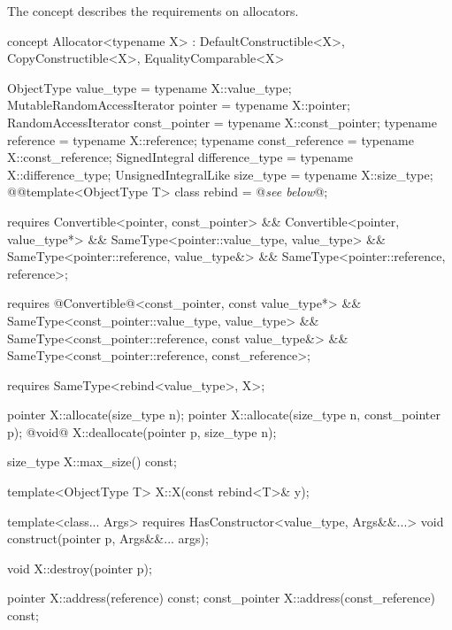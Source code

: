 \documentclass[american,twoside]{book}
\begin{document}

\pnum
{}
{The \mbox{} concept describes the requirements on
  allocators.} 

\color{addclr}
\begin{itemdecl}
concept Allocator<typename X> : DefaultConstructible<X>, CopyConstructible<X>, EqualityComparable<X> {
  ObjectType value_type               = typename X::value_type;
  MutableRandomAccessIterator pointer = typename X::pointer;
  RandomAccessIterator const_pointer  = typename X::const_pointer;
  typename reference                  = typename X::reference;
  typename const_reference            = typename X::const_reference;
  SignedIntegral difference_type      = typename X::difference_type;
  UnsignedIntegralLike size_type      = typename X::size_type; 
  @\textcolor{addclr}{}@template<ObjectType T> class rebind = @\textit{see below}@;

  requires Convertible<pointer, const_pointer> && 
           Convertible<pointer, value_type*> &&
           SameType<pointer::value_type, value_type> &&
           SameType<pointer::reference, value_type&> &&
           SameType<pointer::reference, reference>;

  requires @\textcolor{addclr}{Convertible}@<const_pointer, const value_type*> && 
           SameType<const_pointer::value_type, value_type> &&
           SameType<const_pointer::reference, const value_type&> &&
           SameType<const_pointer::reference, const_reference>;
 
  requires SameType<rebind<value_type>, X>;

  pointer X::allocate(size_type n);
  pointer X::allocate(size_type n, const_pointer p);
  @\textcolor{addclr}{void}@ X::deallocate(pointer p, size_type n);

  size_type X::max_size() const;

  template<ObjectType T>
    X::X(const rebind<T>& y);

  template<class... Args>
    requires HasConstructor<value_type, Args&&...>
    void construct(pointer p, Args&&... args);

  void X::destroy(pointer p);

  pointer X::address(reference) const;
  const_pointer X::address(const_reference) const;
}
\end{itemdecl}
\color{black}
\end{document}

